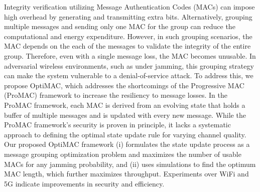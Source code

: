 Integrity verification utilizing Message Authentication Codes (MACs) can impose high overhead by generating and transmitting extra bits. Alternatively, grouping multiple messages and sending only one MAC for the group can reduce the computational and energy expenditure. However, in such grouping scenarios, the MAC depends on the each of the messages to validate the integrity of the entire group. Therefore, even with a single message loss, the MAC becomes unusable. In adversarial wireless environments, such as under jamming, this grouping strategy can make the system vulnerable to a denial-of-service attack. To address this, we propose OptiMAC, which addresses the shortcomings of the Progressive MAC (ProMAC) framework to increase the resiliency to message losses. In the ProMAC framework, each MAC is derived from an evolving state that holds a buffer of multiple messages and is updated with every new message. While the ProMAC framework's security is proven in principle, it lacks a systematic approach to defining the optimal state update rule for varying channel quality. Our proposed OptiMAC framework (i) formulates the state update process as a message grouping optimization problem and maximizes the number of usable MACs for any jamming probability, and (ii) uses simulations to find the optimum MAC length, which further maximizes throughput. Experiments over WiFi and 5G indicate improvements in security and efficiency.
